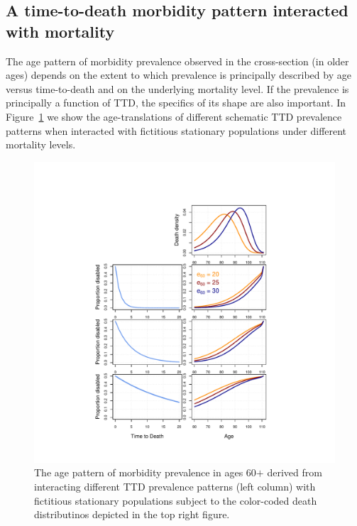 \documentclass[11pt,oneside,a4paper]{article} %
\begin{document}
\FloatBarrier
\subsection{A time-to-death morbidity pattern interacted with mortality}
\label{sec:schematic}
The age pattern of morbidity prevalence observed in the cross-section (in older ages) depends
on the extent to which prevalence is principally described by
age versus time-to-death and on the underlying mortality
level. If the prevalence is principally a function of TTD, the
specifics of its shape are also important. In Figure~\ref{fig:Fig_schematic3} we
show the age-translations of different schematic TTD prevalence patterns when
interacted with fictitious stationary populations under different mortality levels.

\begin{figure}
\begin{adjustwidth}{-1.5cm}{}
	\centering
	\includegraphics[scale=.8]{Figures/schematic3.pdf}
	\caption{The age pattern of morbidity prevalence in ages 60$+$ derived from interacting different TTD prevalence patterns (left column) with fictitious stationary populations subject to the color-coded death distributinos depicted in the top right figure.}
	\label{fig:Fig_schematic3}
\end{adjustwidth}
\end{figure}
\end{document}

